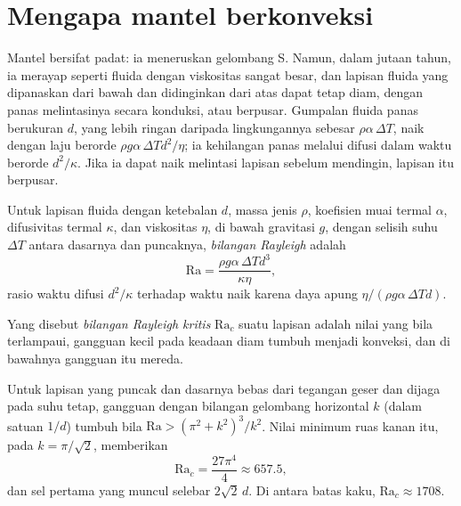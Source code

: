 \section{Mengapa mantel berkonveksi}

Mantel bersifat padat: ia meneruskan gelombang S. Namun, dalam jutaan tahun, ia
merayap seperti fluida dengan viskositas sangat besar, dan lapisan fluida yang dipanaskan dari
bawah dan didinginkan dari atas dapat tetap diam, dengan panas melintasinya secara
konduksi, atau berpusar. Gumpalan fluida panas berukuran $d$, yang lebih ringan daripada
lingkungannya sebesar $\rho\alpha\,\Delta T$, naik dengan laju berorde
$\rho g\alpha\,\Delta T d^2/\eta$; ia kehilangan panas melalui difusi dalam waktu
berorde $d^2/\kappa$. Jika ia dapat naik melintasi lapisan sebelum mendingin, lapisan itu
berpusar.

\begin{definition}\label{def:b3:mantle-convection:rayleigh}
Untuk lapisan fluida dengan ketebalan $d$, massa jenis $\rho$, koefisien muai termal
$\alpha$, difusivitas termal $\kappa$, dan viskositas $\eta$, di bawah
gravitasi $g$, dengan selisih suhu $\Delta T$ antara dasarnya dan
puncaknya, \emph{bilangan Rayleigh} adalah
\[
  \mathrm{Ra} = \frac{\rho g\alpha\,\Delta T d^3}{\kappa\eta},
\]
rasio waktu difusi $d^2/\kappa$ terhadap waktu naik karena daya apung
$\eta/(\rho g\alpha\,\Delta Td)$.
\end{definition}

\begin{definition}\label{def:b3:mantle-convection:critical}
Yang disebut \emph{bilangan Rayleigh kritis}
$\mathrm{Ra}_c$ suatu lapisan adalah nilai  yang bila terlampaui,
gangguan kecil pada keadaan diam tumbuh menjadi konveksi, dan di bawahnya
gangguan itu mereda.
\end{definition}

\begin{proposition}\label{prop:b3:mantle-convection:onset}
Untuk lapisan yang puncak dan dasarnya bebas dari tegangan geser dan dijaga
pada suhu tetap, gangguan dengan bilangan gelombang horizontal $k$ (dalam satuan $1/d$)
tumbuh bila $\mathrm{Ra} > (\pi^2 + k^2)^3/k^2$. Nilai minimum ruas kanan
itu, pada $k = \pi/\sqrt2$, memberikan
\[
  \mathrm{Ra}_c = \frac{27\pi^4}{4} \approx 657.5,
\]
dan sel pertama yang muncul selebar $2\sqrt2\,d$. Di antara batas kaku,
$\mathrm{Ra}_c \approx 1708$.
\end{proposition}

